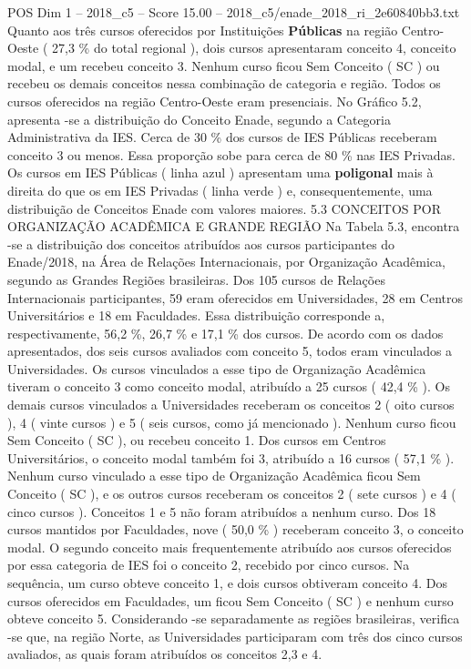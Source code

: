 \begin{textsample}{POS Dim 1 – 2018\_c5 – Score 15.00 – 2018\_c5/enade\_2018\_ri\_2e60840bb3.txt}
Quanto aos três cursos oferecidos por Instituições \textbf{Públicas} na região Centro-Oeste ( 27,3 \% do total regional ), dois cursos apresentaram conceito 4, conceito modal, e um recebeu conceito 3.
Nenhum curso ficou Sem Conceito ( SC ) ou recebeu os demais conceitos nessa combinação de categoria e região.
Todos os cursos oferecidos na região Centro-Oeste eram presenciais.
No Gráfico 5.2, apresenta -se a distribuição do Conceito Enade, segundo a Categoria Administrativa da IES.
Cerca de 30 \% dos cursos de IES Públicas receberam conceito 3 ou menos.
Essa proporção sobe para cerca de 80 \% nas IES Privadas.
Os cursos em IES Públicas ( linha azul ) apresentam uma \textbf{poligonal} mais à direita do que os em IES Privadas ( linha verde ) e, consequentemente, uma distribuição de Conceitos Enade com valores maiores. 5.3 CONCEITOS POR ORGANIZAÇÃO ACADÊMICA E GRANDE REGIÃO Na Tabela 5.3, encontra -se a distribuição dos conceitos atribuídos aos cursos participantes do Enade/2018, na Área de Relações Internacionais, por Organização Acadêmica, segundo as Grandes Regiões brasileiras.
Dos 105 cursos de Relações Internacionais participantes, 59 eram oferecidos em Universidades, 28 em Centros Universitários e 18 em Faculdades.
Essa distribuição corresponde a, respectivamente, 56,2 \%, 26,7 \% e 17,1 \% dos cursos.
De acordo com os dados apresentados, dos seis cursos avaliados com conceito 5, todos eram vinculados a Universidades.
Os cursos vinculados a esse tipo de Organização Acadêmica tiveram o conceito 3 como conceito modal, atribuído a 25 cursos ( 42,4 \% ).
Os demais cursos vinculados a Universidades receberam os conceitos 2 ( oito cursos ), 4 ( vinte cursos ) e 5 ( seis cursos, como já mencionado ).
Nenhum curso ficou Sem Conceito ( SC ), ou recebeu conceito 1.
Dos cursos em Centros Universitários, o conceito modal também foi 3, atribuído a 16 cursos ( 57,1 \% ).
Nenhum curso vinculado a esse tipo de Organização Acadêmica ficou Sem Conceito ( SC ), e os outros cursos receberam os conceitos 2 ( sete cursos ) e 4 ( cinco cursos ).
Conceitos 1 e 5 não foram atribuídos a nenhum curso.
Dos 18 cursos mantidos por Faculdades, nove ( 50,0 \% ) receberam conceito 3, o conceito modal.
O segundo conceito mais frequentemente atribuído aos cursos oferecidos por essa categoria de IES foi o conceito 2, recebido por cinco cursos.
Na sequência, um curso obteve conceito 1, e dois cursos obtiveram conceito 4.
Dos cursos oferecidos em Faculdades, um ficou Sem Conceito ( SC ) e nenhum curso obteve conceito 5.
Considerando -se separadamente as regiões brasileiras, verifica -se que, na região Norte, as Universidades participaram com três dos cinco cursos avaliados, as quais foram atribuídos os conceitos 2,3 e 4.

\end{textsample}
